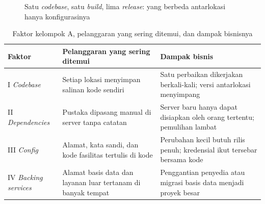 \begin{figure}[!htb]
  \centering
  
  \caption{Satu \textit{codebase}, satu \textit{build}, lima \textit{release}: yang
           berbeda antarlokasi hanya konfigurasinya}
  \label{fig:ch05-satu-kode}
\end{figure}

\begin{table}[!htb]
  \centering
  \footnotesize
  \caption{Faktor kelompok A, pelanggaran yang sering ditemui, dan dampak bisnisnya}
  \label{tab:ch05-kelompok-a}
  \begin{tabularx}{\textwidth}{>{\raggedright\arraybackslash}p{2.1cm}
    >{\raggedright\arraybackslash}X >{\raggedright\arraybackslash}X}
    \hline
    \textbf{Faktor} & \textbf{Pelanggaran yang sering ditemui} & \textbf{Dampak bisnis} \\
    \hline
    I \textit{Codebase} & Setiap lokasi menyimpan salinan kode sendiri & Satu perbaikan
      dikerjakan berkali-kali; versi antarlokasi menyimpang \\
    \hline
    II \textit{Dependencies} & Pustaka dipasang manual di server tanpa catatan & Server
      baru hanya dapat disiapkan oleh orang tertentu; pemulihan lambat \\
    \hline
    III \textit{Config} & Alamat, kata sandi, dan kode fasilitas tertulis di kode &
      Perubahan kecil butuh rilis penuh; kredensial ikut tersebar bersama kode \\
    \hline
    IV \textit{Backing services} & Alamat basis data dan layanan luar tertanam di banyak
      tempat & Penggantian penyedia atau migrasi basis data menjadi proyek besar \\
    \hline
  \end{tabularx}
\end{table}

